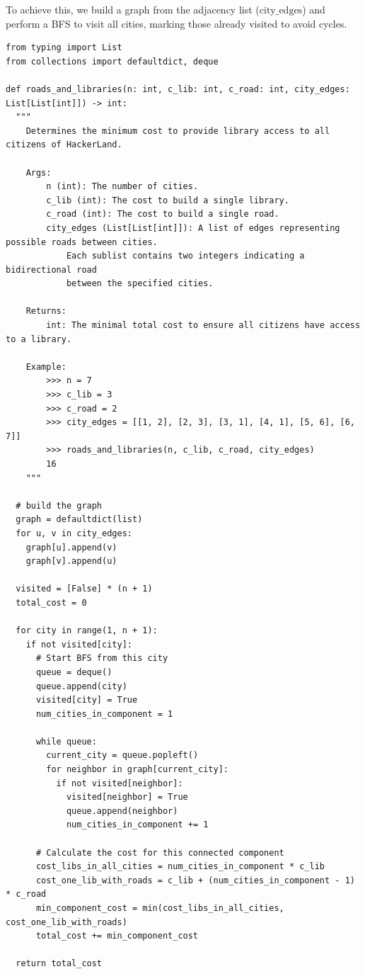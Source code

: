 \documentclass[11pt, a4paper, oneside]{article}
\begin{document}
To achieve this, we build a graph from the adjacency list (\( \text{city\_edges} \)) and perform a BFS to visit all cities, marking those already visited to avoid cycles.

\begin{verbatim}
from typing import List
from collections import defaultdict, deque

def roads_and_libraries(n: int, c_lib: int, c_road: int, city_edges: List[List[int]]) -> int:
  """
    Determines the minimum cost to provide library access to all citizens of HackerLand.

    Args:
        n (int): The number of cities.
        c_lib (int): The cost to build a single library.
        c_road (int): The cost to build a single road.
        city_edges (List[List[int]]): A list of edges representing possible roads between cities.
            Each sublist contains two integers indicating a bidirectional road
            between the specified cities.

    Returns:
        int: The minimal total cost to ensure all citizens have access to a library.

    Example:
        >>> n = 7
        >>> c_lib = 3
        >>> c_road = 2
        >>> city_edges = [[1, 2], [2, 3], [3, 1], [4, 1], [5, 6], [6, 7]]
        >>> roads_and_libraries(n, c_lib, c_road, city_edges)
        16
    """

  # build the graph
  graph = defaultdict(list)
  for u, v in city_edges:
    graph[u].append(v)
    graph[v].append(u)

  visited = [False] * (n + 1)
  total_cost = 0

  for city in range(1, n + 1):
    if not visited[city]:
      # Start BFS from this city
      queue = deque()
      queue.append(city)
      visited[city] = True
      num_cities_in_component = 1

      while queue:
        current_city = queue.popleft()
        for neighbor in graph[current_city]:
          if not visited[neighbor]:
            visited[neighbor] = True
            queue.append(neighbor)
            num_cities_in_component += 1

      # Calculate the cost for this connected component
      cost_libs_in_all_cities = num_cities_in_component * c_lib
      cost_one_lib_with_roads = c_lib + (num_cities_in_component - 1) * c_road
      min_component_cost = min(cost_libs_in_all_cities, cost_one_lib_with_roads)
      total_cost += min_component_cost
  
  return total_cost
\end{verbatim}
\end{document}
